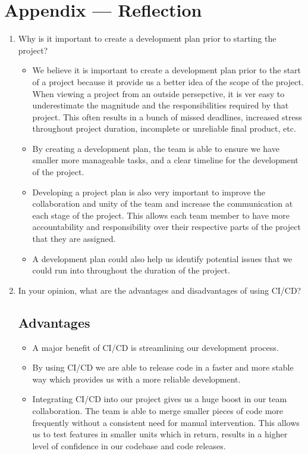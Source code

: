 \documentclass{article}
\begin{document}
\newpage{}

\section*{Appendix --- Reflection}

\begin{enumerate}
    \item Why is it important to create a development plan prior to starting the
    project?

	\begin{itemize}
		\item We believe it is important to create a development plan prior to the start of
		a project because it provide us a better idea of the scope of the project. When 
		viewing a project from an outside persepctive, it is ver easy to underestimate
		the magnitude and the responsibilities required by that project. This often results
		in a bunch of missed deadlines, increased stress throughout project duration, 
		incomplete or unreliable final product, etc.
		\item By creating a development plan, the team is able to ensure we have smaller 
		more manageable tasks, and a clear timeline for the development of the project.
		\item Developing a project plan is also very important to improve the collaboration
		and unity of the team and increase the communication at each stage of the project.
		This allows each team member to have more accountability and responsibility over
		their respective parts of the project that they are assigned.
		\item A development plan could also help us identify potential issues that we could
		run into throughout the duration of the project.
	\end{itemize}

    \item In your opinion, what are the advantages and disadvantages of using
    CI/CD?
	\subsection*{Advantages}
	\begin{itemize}
		\item A major benefit of CI/CD is streamlining our development process.
		\item By using CI/CD we are able to release code in a faster and more stable way which
		provides us with a more reliable development.
		\item Integrating CI/CD into our project gives us a huge boost in our team collaboration.
		The team is able to merge smaller pieces of code more frequently without a consistent
		need for manual intervention. This allows us to test features in smaller units which in
		return, results in a higher level of confidence in our codebase and code releases.
	\end{itemize}

\end{enumerate}
\end{document}
